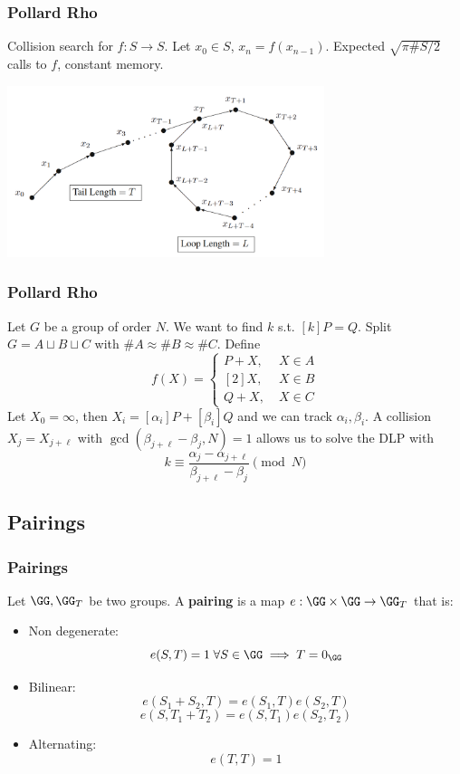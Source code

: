 \documentclass{beamer}
\begin{document}
\begin{frame}
    \frametitle{Pollard Rho}
    Collision search for $f: S \to S$. Let $x_0 \in S$, $x_n = f(x_{n-1})$.
    \pause
    Expected $\sqrt{\pi \#S/2}$ calls to $f$, constant memory.
    \pause
    \begin{center}
        \includegraphics[width=25em]{pollard_rho.PNG}
    \end{center}
\end{frame}

\begin{frame}
    \frametitle{Pollard Rho}
    Let $G$ be a group of order $N$. We want to find $k$ s.t. $[k]P = Q$.
    \pause
    Split $G = A \sqcup B \sqcup C$ with $\# A \approx \# B \approx \#C$.
    \pause
    Define 
    \[ f(X) = \begin{cases}
        P + X, \; &X \in A \\
        [2]X, \; &X \in B \\
        Q + X, \; &X \in C
    \end{cases} \]
    \pause
    Let $X_0 = \infty$, then $X_i = [\alpha_i] P + [\beta_i] Q$ and we can track $\alpha_i, \beta_i$. 
    A collision $X_j = X_{j+\ell}$ with $\gcd(\beta_{j+\ell} - \beta_j, N) = 1$ allows us to solve the DLP with
    \[ k \equiv \frac{\alpha_j - \alpha_{j + \ell}}{\beta_{j+\ell} - \beta_j} \pmod{N} \]

\end{frame}

\subsection{Pairings}
\begin{frame}
    \frametitle{Pairings}
    \begin{definition}
        Let $\GG, \GG_T$ be two groups. A \textbf{pairing} is a map $e: \GG \times \GG \to \GG_T$ that is:
        \pause
        \begin{itemize}
            \item<2-> Non degenerate: 
            \[ e(S, T) = 1 \; \forall S \in \GG \implies T = 0_{\GG}  \]
            \item<3-> Bilinear:
            \[ e(S_1 + S_2, T) = e(S_1, T)e(S_2, T)\]
            \[ e(S, T_1 + T_2) = e(S, T_1)e(S_2, T_2)\]
            \item<4-> Alternating:
            \[ e(T, T) = 1 \]
            
        \end{itemize}
    \end{definition}
\end{frame}
\end{document}

